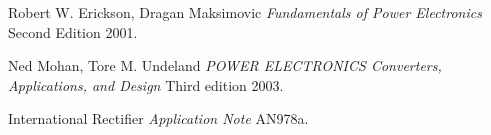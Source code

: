 \documentclass[11pt,a4paper]{report}
\begin{document}

    
     
\setcounter{page}{1}
\tableofcontents


\listoftables


\listoffigures







%








\begin{thebibliography}{}
   Robert W. Erickson, Dragan Maksimovic {\em Fundamentals of
  Power Electronics} Second Edition 2001.
  
    Ned Mohan, Tore M. Undeland {\em POWER ELECTRONICS Converters, Applications, and Design} Third edition 2003.


   International Rectifier {\em Application Note} AN978a.




\end{thebibliography}

%
%




\appendix


%

\end{document}
